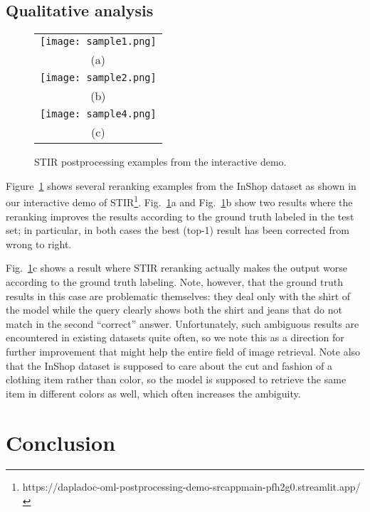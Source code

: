 \documentclass{article}
\begin{document}
\subsection{Qualitative analysis}

\begin{figure}[!t]\centering
\begin{tabular}{c}
    \texttt{[image: sample1.png]}
    \\ (a) \\
    \texttt{[image: sample2.png]}
    \\ (b) \\
    \texttt{[image: sample4.png]}
    \\ (c) 
\end{tabular}
    \caption{STIR postprocessing examples from the interactive demo.}\label{fig:demo}
\end{figure}

Figure~\ref{fig:demo} shows several reranking examples from the InShop dataset as shown in our interactive demo of STIR\footnote{https://dapladoc-oml-postprocessing-demo-srcappmain-pfh2g0.streamlit.app/}. Fig.~\ref{fig:demo}a and Fig.~\ref{fig:demo}b show two results where the reranking improves the results according to the ground truth labeled in the test set; in particular, in both cases the best (top-1) result has been corrected from wrong to right.

Fig.~\ref{fig:demo}c shows a result where STIR reranking actually makes the output worse according to the ground truth labeling. Note, however, that the ground truth results in this case are problematic themselves: they deal only with the shirt of the model while the query clearly shows both the shirt and jeans that do not match in the second ``correct'' answer. Unfortunately, such ambiguous results are encountered in existing datasets quite often, so we note this as a direction for further improvement that might help the entire field of image retrieval. Note also that the InShop dataset is supposed to care about the cut and fashion of a clothing item rather than color, so the model is supposed to retrieve the same item in different colors as well, which often increases the ambiguity.

\section{Conclusion}\label{sec:concl}
\end{document}
